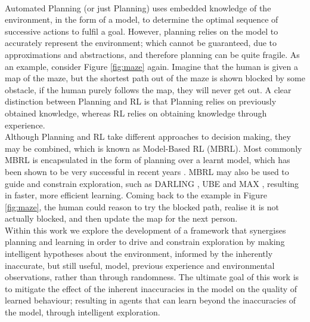 \\Automated Planning (or just Planning) \cite{DBLP:books/aw/RN2020, Lav06} uses embedded knowledge of the environment, in the form of a model, to determine the optimal sequence of successive actions to fulfil a goal. However, planning relies on the model to accurately represent the environment; which cannot be guaranteed, due to approximations and abstractions, and therefore planning can be quite fragile. As an example, consider Figure \ref{fig:maze} again. Imagine that the human is given a map of the maze, but the shortest path out of the maze is shown blocked by some obstacle, if the human purely follows the map, they will never get out. A clear distinction between Planning and RL is that Planning relies on previously obtained knowledge, whereas RL relies on obtaining knowledge through experience.
\\Although Planning and RL take different approaches to decision making, they may be combined, which is known as Model-Based RL (MBRL). Most commonly MBRL is encapsulated in the form of planning over a learnt model, which has been shown to be very successful in recent years  \cite{silver2017mastering, pmlr-v28-levine13}. MBRL may also be used to guide and constrain exploration, such as DARLING \cite{AIJ16-leonetti}, UBE \cite{DBLP:journals/corr/abs-1709-05380} and MAX \cite{DBLP:journals/corr/abs-1810-12162}, resulting in faster, more efficient learning. Coming back to the example in Figure \ref{fig:maze}, the human could reason to try the blocked path, realise it is not actually blocked, and then update the map for the next person.
\\Within this work we explore the development of a framework that synergises planning and learning in order to drive and constrain exploration by making intelligent hypotheses about the environment, informed by the inherently inaccurate, but still useful, model, previous experience and environmental observations, rather than through randomness. The ultimate goal of this work is to mitigate the effect of the inherent inaccuracies in the model on the quality of learned behaviour; resulting in agents that can learn beyond the inaccuracies of the model, through intelligent exploration.

